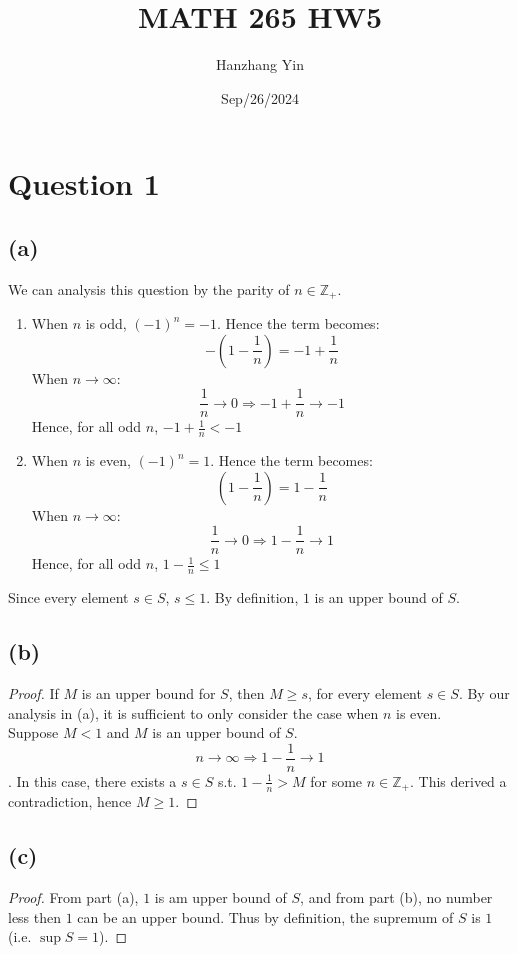 \documentclass{article}
\title{MATH 265 HW5}
\author{Hanzhang Yin}
\date{Sep/26/2024}
\begin{document}
\maketitle

\section*{Question 1}

\subsection*{(a)}
We can analysis this question by the parity of $n \in \mathbb{Z}_{+}$.
\begin{enumerate}
    \item When $n$ is odd, \((-1)^n = -1 \). Hence the term becomes:
    \\
    \[ - \left( 1 - \frac{1}{n} \right) = -1 + \frac{1}{n} \]
    When $n \rightarrow \infty$:
    \[ \frac{1}{n} \rightarrow 0 \Rightarrow -1 + \frac{1}{n} \rightarrow -1 \]
    Hence, for all odd $n$, \( -1 + \frac{1}{n} < -1 \)
    \item When $n$ is even, \((-1)^n = 1 \). Hence the term becomes:
    \[ \left( 1 - \frac{1}{n} \right) = 1 - \frac{1}{n} \]
    When $n \rightarrow \infty$:
    \[ \frac{1}{n} \rightarrow 0 \Rightarrow 1 - \frac{1}{n} \rightarrow 1 \]
    Hence, for all odd $n$, \( 1 - \frac{1}{n} \leq 1 \)
\end{enumerate}
Since every element $s \in S$, $s \leq 1$. By definition, $1$ is an upper bound of $S$.

\subsection*{(b)}

\begin{proof}
    If $M$ is an upper bound for $S$, then $M \geq s$, for every element $s \in S$.
    By our analysis in (a), it is sufficient to only consider the case when $n$ is even.
    \\
    Suppose $M < 1$ and $M$ is an upper bound of $S$.
    \[ n \rightarrow \infty \Rightarrow 1 - \frac{1}{n} \rightarrow 1 \]. 
    In this case, there exists a $s \in S$ s.t. $1 - \frac{1}{n} > M$ for some $n \in \mathbb{Z}_{+}$.
    This derived a contradiction, hence $M \geq 1$. 
\end{proof}

\subsection*{(c)}
\begin{proof}
    From part (a), $1$ is am upper bound of $S$, and from part (b), no number less then $1$ can be an upper bound.
    Thus by definition, the supremum of $S$ is $1$ (i.e. $\sup S = 1$).
\end{proof}
\end{document}
